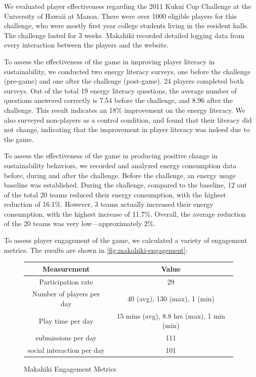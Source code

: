 \documentclass{sigchi}
\newcommand\tabhead[1]{\small\textbf{#1}}
\begin{document}
We evaluated player effectiveness regarding the 2011 Kukui Cup Challenge at the University of
Hawaii at Manoa. There were over 1000 eligible players for this challenge, who were mostly
first year college students living in the resident halls. The challenge lasted for 3
weeks.  Makahiki recorded detailed logging data from every interaction between the players
and the website.

To assess the effectiveness of the game in improving player literacy in sustainability, we
conducted two energy literacy surveys, one before the challenge (pre-game) and one after
the challenge (post-game). 24 players completed both surveys. Out of the total 19 energy
literacy questions, the average number of questions answered correctly is 7.54 before the
challenge, and 8.96 after the challenge. This result indicates an 18\% improvement on the
energy literacy.  We also surveyed non-players as a control condition, and found that
their literacy did not change, indicating that the improvement in player literacy was
indeed due to the game. 

To assess the effectiveness of the game in producing positive change in sustainability
behaviors, we recorded and analyzed energy consumption data before, during and after the
challenge.  Before the challenge, an energy usage baseline was established. During the
challenge, compared to the baseline, 12 out of the total 20 teams reduced their energy
consumption, with the highest reduction of 16.1\%. However, 3 teams actually increased
their energy consumption, with the highest increase of 11.7\%. Overall, the average
reduction of the 20 teams was very low---approximately 2\%.

To assess player engagement of the game, we calculated a variety of engagement
metrics. The results are shown in \autoref{fig:makahiki-engagement}:

\begin{figure}[ht!]
  \centering
  \begin{tabular}{|c|c|}
    \hline
    \multicolumn{1}{|p{0.5\columnwidth}|}{\centering\tabhead{Measurement}} &
    \multicolumn{1}{|p{0.5\columnwidth}|}{\centering\tabhead{Value}} \\
    \hline
    \multicolumn{1}{|p{0.5\columnwidth}|}{Participation rate} &
    \multicolumn{1}{|p{0.5\columnwidth}|}{29} \\
    \hline
    \multicolumn{1}{|p{0.5\columnwidth}|}{Number of players per day} &
    \multicolumn{1}{|p{0.5\columnwidth}|}{40 (avg), 130 (max), 1 (min)} \\
    \hline
    \multicolumn{1}{|p{0.5\columnwidth}|}{Play time per day} &
    \multicolumn{1}{|p{0.5\columnwidth}|}{15 mins (avg), 8.8 hrs (max), 1 min (min)} \\
    \hline
    \multicolumn{1}{|p{0.5\columnwidth}|}{submissions per day} &
    \multicolumn{1}{|p{0.5\columnwidth}|}{111} \\
    \hline
    \multicolumn{1}{|p{0.5\columnwidth}|}{social interaction per day} &
    \multicolumn{1}{|p{0.5\columnwidth}|}{101} \\
    \hline
  \end{tabular}
  \caption{Makahiki Engagement Metrics}
  \label{fig:makahiki-engagement}
\end{figure}
\end{document}

